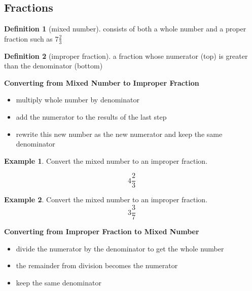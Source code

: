 \documentclass[addpoints,12pt]{exam}
\theoremstyle{definition}
\newtheorem{example}{Example}[subsection]
\newtheorem{definition}{Definition}[subsection]
\begin{document}
\setcounter{section}{1}
\setcounter{subsection}{1}

\subsection{Fractions}

\begin{definition}[mixed number]
consists of both a whole  number and a proper fraction such as $7\frac{2}{3}$
\end{definition}

\begin{definition}[improper fraction]
a fraction whose numerator (top) is greater than the denominator (bottom)
\end{definition}

\vspace{.5in}

\begin{mdframed}
\textbf{Converting from Mixed Number to Improper Fraction}
\begin{itemize}
\item multiply whole number by denominator
\item add the numerator to the results of the last step
\item rewrite this new number as the new numerator and keep the same denominator
\end{itemize}
\end{mdframed}

\vspace{.5in}

\begin{example}
Convert the mixed number to an improper fraction.

\[4\dfrac{2}{3}\]
\vspace{1in}
\end{example}
\begin{example}
Convert the mixed number to an improper fraction.
\[3\dfrac{3}{7}\]
\vspace{1in}
\end{example}

\newpage

\begin{mdframed}
\textbf{Converting from Improper Fraction to Mixed Number}
\begin{itemize}
\item divide the numerator by the denominator to get the whole number
\item the remainder from division becomes the numerator
\item keep the same denominator
\end{itemize}
\end{mdframed}
\end{document}
